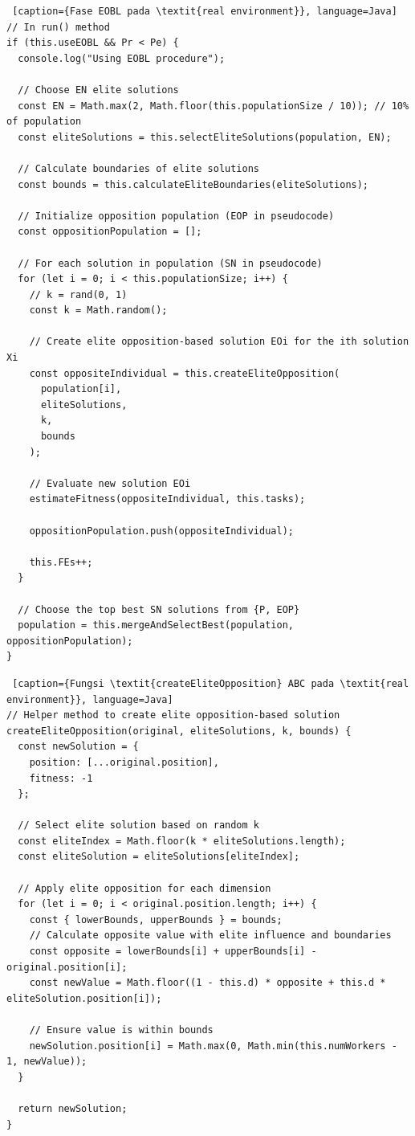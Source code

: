 \begin{lstlisting} [caption={Fase EOBL pada \textit{real environment}}, language=Java]
// In run() method
if (this.useEOBL && Pr < Pe) {
  console.log("Using EOBL procedure");
  
  // Choose EN elite solutions
  const EN = Math.max(2, Math.floor(this.populationSize / 10)); // 10% of population
  const eliteSolutions = this.selectEliteSolutions(population, EN);
  
  // Calculate boundaries of elite solutions
  const bounds = this.calculateEliteBoundaries(eliteSolutions);
  
  // Initialize opposition population (EOP in pseudocode)
  const oppositionPopulation = [];
  
  // For each solution in population (SN in pseudocode)
  for (let i = 0; i < this.populationSize; i++) {
    // k = rand(0, 1)
    const k = Math.random();
    
    // Create elite opposition-based solution EOi for the ith solution Xi
    const oppositeIndividual = this.createEliteOpposition(
      population[i], 
      eliteSolutions, 
      k,
      bounds
    );
    
    // Evaluate new solution EOi
    estimateFitness(oppositeIndividual, this.tasks);
    
    oppositionPopulation.push(oppositeIndividual);
    
    this.FEs++;
  }
  
  // Choose the top best SN solutions from {P, EOP}
  population = this.mergeAndSelectBest(population, oppositionPopulation);
}
\end{lstlisting}

\begin{lstlisting} [caption={Fungsi \textit{createEliteOpposition} ABC pada \textit{real environment}}, language=Java]
// Helper method to create elite opposition-based solution
createEliteOpposition(original, eliteSolutions, k, bounds) {
  const newSolution = {
    position: [...original.position],
    fitness: -1
  };

  // Select elite solution based on random k
  const eliteIndex = Math.floor(k * eliteSolutions.length);
  const eliteSolution = eliteSolutions[eliteIndex];

  // Apply elite opposition for each dimension
  for (let i = 0; i < original.position.length; i++) {
    const { lowerBounds, upperBounds } = bounds;
    // Calculate opposite value with elite influence and boundaries
    const opposite = lowerBounds[i] + upperBounds[i] - original.position[i];
    const newValue = Math.floor((1 - this.d) * opposite + this.d * eliteSolution.position[i]);
    
    // Ensure value is within bounds
    newSolution.position[i] = Math.max(0, Math.min(this.numWorkers - 1, newValue));
  }

  return newSolution;
}
\end{lstlisting}